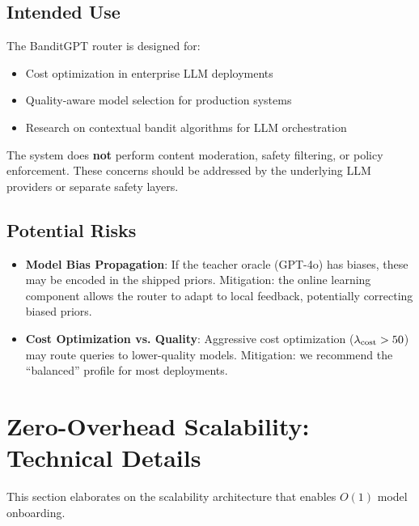 \subsection{Intended Use}

The BanditGPT router is designed for:
\begin{itemize}[leftmargin=*]
    \item Cost optimization in enterprise LLM deployments
    \item Quality-aware model selection for production systems
    \item Research on contextual bandit algorithms for LLM orchestration
\end{itemize}

The system does \textbf{not} perform content moderation, safety filtering, or policy enforcement. These concerns should be addressed by the underlying LLM providers or separate safety layers.

\subsection{Potential Risks}

\begin{itemize}[leftmargin=*]
    \item \textbf{Model Bias Propagation}: If the teacher oracle (GPT-4o) has biases, these may be encoded in the shipped priors. Mitigation: the online learning component allows the router to adapt to local feedback, potentially correcting biased priors.
    
    \item \textbf{Cost Optimization vs. Quality}: Aggressive cost optimization ($\lambda_{\text{cost}} > 50$) may route queries to lower-quality models. Mitigation: we recommend the ``balanced'' profile for most deployments.
\end{itemize}


\section{Zero-Overhead Scalability: Technical Details}
\label{app:scalability}

This section elaborates on the scalability architecture that enables $O(1)$ model onboarding.

